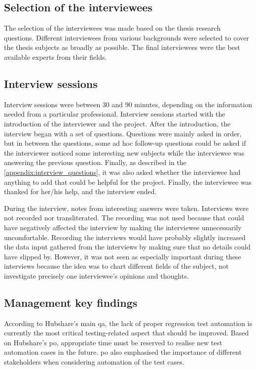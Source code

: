 \subsection{Selection of the interviewees}
The selection of the interviewees was made based on the thesis research questions. Different interviewees from various backgrounds were selected to cover the thesis subjects as broadly as possible. The final interviewees were the best available experts from their fields.

\subsection{Interview sessions}
Interview sessions were between 30 and 90 minutes, depending on the information needed from a particular professional. Interview sessions started with the introduction of the interviewer and the project. After the introduction, the interview began with a set of questions. Questions were mainly asked in order, but in between the questions, some ad hoc follow-up questions could be asked if the interviewer noticed some interesting new subjects while the interviewee was answering the previous question. Finally, as described in the \autoref{appendix:interview_questions}, it was also asked whether the interviewee had anything to add that could be helpful for the project. Finally, the interviewee was thanked for her/his help, and the interview ended.

During the interview, notes from interesting answers were taken. Interviews were not recorded nor transliterated. The recording was not used because that could have negatively affected the interview by making the interviewee unnecessarily uncomfortable. Recording the interviews would have probably slightly increased the data input gathered from the interviews by making sure that no details could have slipped by. However, it was not seen as especially important during these interviews because the idea was to chart different fields of the subject, not investigate precisely one interviewee's opinions and thoughts.

\subsection{Management key findings}\label{subsection:management_key_findings}
According to Hubshare's main \gls{qa}, the lack of proper regression test automation is currently the most critical testing-related aspect that should be improved. Based on Hubshare's \gls{po}, appropriate time must be reserved to realise new test automation cases in the future. \gls{po} also emphasised the importance of different stakeholders when considering automation of the test cases.

